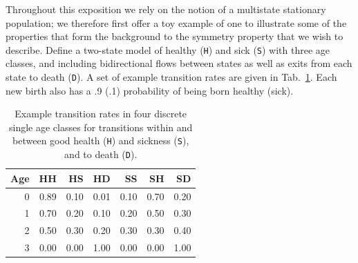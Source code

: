 \documentclass[12pt,oneside,a4paper]{article}
\theoremstyle{definition}
\newcommand{\vb}[1]{\texttt{#1}}
\begin{document}
Throughout this exposition we rely on the notion of a multistate stationary population; we therefore first offer a toy example of one to illustrate some of the properties that form the background to the symmetry property that we wish to describe. Define a two-state model of healthy (\vb{H}) and sick (\vb{S}) with three age classes, and including bidirectional flows between states as well as exits from each state to death (\vb{D}). A set of example transition rates are given in Tab.~\ref{tab:toy}. Each new birth also has a .9 (.1) probability of being born healthy (sick). 


\begin{table}[ht]
\centering
 \caption{Example transition rates in four discrete single age classes for transitions within and between good health (\vb{H}) and sickness (\vb{S}), and to death (\vb{D}).}
 \label{tab:toy}
\begin{tabular}{rrrrrrr}
  \hline
Age & HH & HS & HD & SS & SH & SD \\ 
  \hline
0 & 0.89 & 0.10 & 0.01 & 0.10 & 0.70 & 0.20 \\ 
  1 & 0.70 & 0.20 & 0.10 & 0.20 & 0.50 & 0.30 \\ 
  2 & 0.50 & 0.30 & 0.20 & 0.30 & 0.30 & 0.40 \\ 
  3 & 0.00 & 0.00 & 1.00 & 0.00 & 0.00 & 1.00 \\ 
   \hline
\end{tabular}
\end{table}
\end{document}
